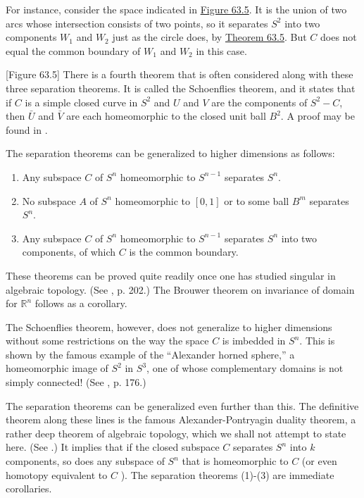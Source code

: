 For instance, consider the space indicated in \hyperref[fig:63.5]{Figure 63.5}. It is the union of two arcs whose intersection consists of two points, so it separates \(S^{2}\) into two components \(W_{1}\) and \(W_{2}\) just as the circle does, by \hyperref[thm:63.5]{Theorem 63.5}. But \(C\) does not equal the common boundary of \(W_{1}\) and \(W_{2}\) in this case.

[Figure 63.5]
There is a fourth theorem that is often considered along with these three separation theorems. It is called the Schoenflies theorem, and it states that if \(C\) is a simple closed curve in \(S^{2}\) and \(U\) and \(V\) are the components of \(S^{2} - C\), then \(\bar{U}\) and \(\bar{V}\) are each homeomorphic to the closed unit ball \(B^{2}\). A proof may be found in \cite{HallSpencer1955}.

The separation theorems can be generalized to higher dimensions as follows:
\begin{enumerate}[itemsep=0.2em, parsep=0pt, topsep=0pt, partopsep=0pt, leftmargin=*, label=(\arabic*), align=left]
\item Any subspace \(C\) of \(S^{n}\) homeomorphic to \(S^{n - 1}\) separates \(S^{n}\).
\item No subspace \(A\) of \(S^{n}\) homeomorphic to \([ {0,1}]\) or to some ball \(B^{m}\) separates \(S^{n}\).
\item Any subspace \(C\) of \(S^{n}\) homeomorphic to \(S^{n - 1}\) separates \(S^{n}\) into two components, of which \(C\) is the common boundary.
\end{enumerate}

These theorems can be proved quite readily once one has studied singular  in algebraic topology. (See \cite{Munkres1993}, p. 202.) The Brouwer theorem on invariance of domain for \(\mathbb{R}^{n}\) follows as a corollary.

The Schoenflies theorem, however, does not generalize to higher dimensions without some restrictions on the way the space \(C\) is imbedded in \(S^{n}\). This is shown by the famous example of the ``Alexander horned sphere,'' a homeomorphic image of \(S^{2}\) in \(S^{3}\), one of whose complementary domains is not simply connected! (See \cite{HockingYoung1961}, p. 176.)

The separation theorems can be generalized even further than this. The definitive theorem along these lines is the famous Alexander-Pontryagin duality theorem, a rather deep theorem of algebraic topology, which we shall not attempt to state here. (See \cite{Munkres1993}.) It implies that if the closed subspace \(C\) separates \(S^{n}\) into \(k\) components, so does any subspace of \(S^{n}\) that is homeomorphic to \(C\) (or even homotopy equivalent to \(C\) ). The separation theorems (1)-(3) are immediate corollaries.

